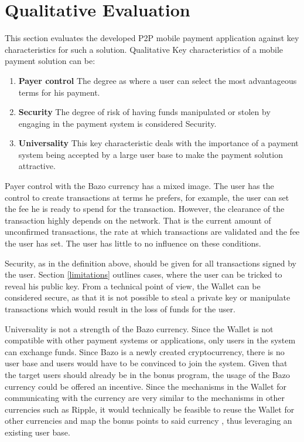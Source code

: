 \section{Qualitative Evaluation}
This section evaluates the developed P2P mobile payment application against key characteristics for such a solution. Qualitative Key characteristics of a mobile payment solution can be:
\begin{enumerate}
\item \textbf{Payer control}
The degree as where a user can select the most advantageous terms for his payment.
\item \textbf{Security}
The degree of risk of having funds manipulated or stolen by engaging in the payment system is considered Security.
\item \textbf{Universality}
This key characteristic deals with the importance of a payment system being accepted by a large user base to make the payment solution attractive.
\end{enumerate}

Payer control with the Bazo currency has a mixed image.
The user has the control to create transactions at terms he prefers, for example, the user can set the fee he is ready to spend for the transaction. However, the clearance of the transaction highly depends on the network. That is the current amount of unconfirmed transactions, the rate at which transactions are validated and the fee the user has set. The user has little to no influence on these conditions.

Security, as in the definition above, should be given for all transactions signed by the user. Section \ref{limitations} outlines cases, where the user can be tricked to reveal his public key. From a technical point of view, the Wallet can be considered secure, as that it is not possible to steal a private key or manipulate transactions which would result in the loss of funds for the user.

Universality is not a strength of the Bazo currency. Since the Wallet is not compatible with other payment systems or applications, only users in the system can exchange funds. Since Bazo is a newly created cryptocurrency, there is no user base and users would have to be convinced to join the system. Given that the target users should already be in the bonus program, the usage of the Bazo currency could be offered an incentive. Since the mechanisms in the Wallet for communicating with the currency are very similar to the mechanisms in other currencies such as Ripple, it would technically be feasible to reuse the Wallet for other currencies and map the bonus points to said currency \cite{ripplelib}, thus leveraging an existing user base.


